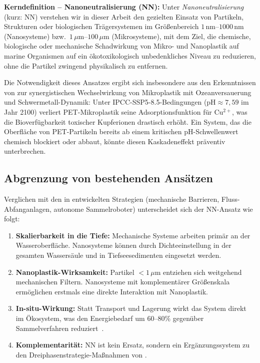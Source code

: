 ﻿\documentclass[12pt,a4paper]{article}
\theoremstyle{definition}
\theoremstyle{remark}
\begin{document}
\begin{mdframed}[backgroundcolor=lightgray, linecolor=deepblue, linewidth=0.8pt]
\textbf{Kerndefinition -- Nanoneutralisierung (NN):}
Unter \emph{Nanoneutralisierung} (kurz: NN) verstehen wir in dieser Arbeit
den gezielten Einsatz von Partikeln, Strukturen oder biologischen Trägersystemen
im Größenbereich $1\,\text{nm}$--$1000\,\text{nm}$ (Nanosysteme) bzw.\
$1\,\mu\text{m}$--$100\,\mu\text{m}$ (Mikrosysteme), mit dem Ziel, die
chemische, biologische oder mechanische Schadwirkung von Mikro- und Nanoplastik
auf marine Organismen auf ein ökotoxikologisch unbedenkliches Niveau zu reduzieren,
ohne die Partikel zwingend physikalisch zu entfernen.
\end{mdframed}

Die Notwendigkeit dieses Ansatzes ergibt sich insbesondere aus den Erkenntnissen
von \cite{ocnscnce_epp2026} zur synergistischen Wechselwirkung von Mikroplastik
mit Ozeanversauerung und Schwermetall-Dynamik: Unter IPCC-SSP5-8.5-Bedingungen
($\text{pH} \approx 7{,}59$ im Jahr 2100) verliert PET-Mikroplastik seine
Adsorptionsfunktion für Cu$^{2+}$, was die Bioverfügbarkeit toxischer
Kupferionen drastisch erhöht. Ein System, das die Oberfläche von
PET-Partikeln bereits ab einem kritischen pH-Schwellenwert chemisch blockiert
oder abbaut, könnte diesen Kaskadeneffekt präventiv unterbrechen.

\subsection{Abgrenzung von bestehenden Ansätzen}

Verglichen mit den in \cite{cleanocn_epp2026} entwickelten Strategien
(mechanische Barrieren, Fluss-Abfanganlagen, autonome Sammelroboter) unterscheidet
sich der NN-Ansatz wie folgt:

\begin{enumerate}[label=\textbf{U\arabic*.}]
\item \textbf{Skalierbarkeit in die Tiefe:} Mechanische Systeme arbeiten primär
an der Wasseroberfläche. Nanosysteme können durch Dichteeinstellung in der gesamten
Wassersäule und in Tiefseesedimenten eingesetzt werden.
\item \textbf{Nanoplastik-Wirksamkeit:} Partikel $< 1\,\mu\text{m}$ entziehen
sich weitgehend mechanischen Filtern. Nanosysteme mit komplementärer Größenskala
ermöglichen erstmals eine direkte Interaktion mit Nanoplastik.
\item \textbf{In-situ-Wirkung:} Statt Transport und Lagerung wirkt das System
direkt im Ökosystem, was den Energiebedarf um $60$--$80\%$ gegenüber
Sammelverfahren reduziert~\cite{koelmans2022risk}.
\item \textbf{Komplementarität:} NN ist kein Ersatz, sondern ein Ergänzungssystem
zu den Dreiphasenstrategie-Maßnahmen von \cite{cleanocn_epp2026}.
\end{enumerate}
\end{document}

